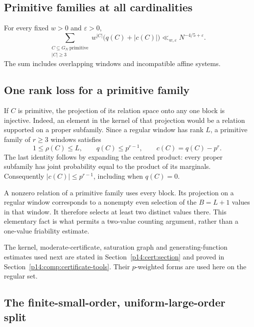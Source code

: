 \subsection{Primitive families at all cardinalities}

\begin{theorem}
\label{p1:core:primitive}
For every fixed $w>0$ and $\varepsilon>0$,
\begin{equation}
 \sum_{\substack{C\subseteq G_N\ \mathrm{primitive}\\|C|\ge3}}
 w^{|C|}\bigl(q(C)+|c(C)|\bigr)
 \ll_{w,\varepsilon}N^{-4/5+\varepsilon}.
 \label{p1:core:primitive-bound}
\end{equation}
The sum includes overlapping windows and incompatible affine systems.
\end{theorem}

\subsection{One rank loss for a primitive family}

If $C$ is primitive, the projection of its relation space onto any one
block is injective. Indeed, an element in the kernel of that projection
would be a relation supported on a proper subfamily. Since a regular
window has rank $L$, a primitive family of $r\ge3$ windows satisfies
\begin{equation}
 1\le\rho(C)\le L,\qquad
 q(C)\le p^{r-1},\qquad c(C)=q(C)-p^r.
 \label{p1:core:primitive-rank}
\end{equation}
The last identity follows by expanding the centred product: every proper
subfamily has joint probability equal to the product of its marginals.
Consequently $|c(C)|\le p^{r-1}$, including when $q(C)=0$.

A nonzero relation of a primitive family uses every block. Its projection
on a regular window corresponds to a nonempty even selection of the
$B=L+1$ values in that window. It therefore selects at least two distinct
values there. This elementary fact is what permits a two-value counting
argument, rather than a one-value friability estimate.

The kernel, moderate-certificate, saturation graph and generating-function
estimates used next are stated in Section~\ref{p14:cert:section} and
proved in Section~\ref{p14:comp:certificate-tools}. Their $p$-weighted
forms are used here on the regular set.

\subsection{The finite-small-order, uniform-large-order split}

